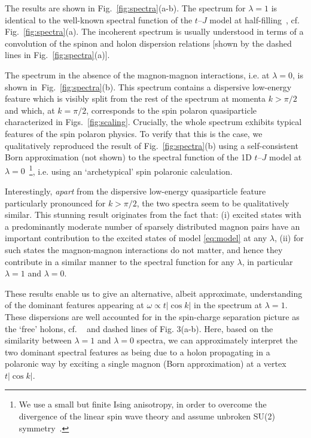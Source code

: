\documentclass[%
 reprint,
 amsmath,amssymb,
 aps,
prl,
]{revtex4-1}
\begin{document}
The results are shown in Fig.~\ref{fig:spectra}(a-b). The spectrum for $\lambda = 1$ is identical to the well-known spectral function of the $t$--$J$ model at half-filling~\cite{Kim96, Senechal2000}, cf. Fig.~\ref{fig:spectra}(a).
The incoherent spectrum is usually understood in terms of a convolution of the spinon and holon dispersion relations [shown by the dashed lines in Fig.~\ref{fig:spectra}(a)].

The spectrum in the absence of the magnon-magnon interactions, i.e. at $\lambda =0$,  is shown in~Fig.~\ref{fig:spectra}(b). 
This spectrum contains a dispersive low-energy feature which is visibly split from the rest of the spectrum at momenta $k> \pi/2$ and which, at $k=\pi/2$, corresponds to the spin polaron quasiparticle characterized in Figs.~\ref{fig:scaling}. Crucially, the whole spectrum exhibits typical features of the spin polaron physics. To verify that this is the case, we qualitatively reproduced the result of Fig.~\ref{fig:spectra}(b) using a self-consistent Born approximation (not shown) to the spectral function of the 1D $t$--$J$ model at $\lambda =0$~\footnote{We use a small but finite Ising anisotropy, in order to overcome the divergence of the linear spin wave theory and assume unbroken SU(2) symmetry~\cite{Brink1998}.}, i.e. using an `archetypical' spin polaronic calculation. 

Interestingly, {\it apart} from the dispersive low-energy
quasiparticle feature particularly pronounced for $k> \pi/2$, the two spectra seem to be qualitatively similar. 
This stunning result originates from the fact that: (i) excited states with a predominantly moderate number of sparsely distributed magnon pairs have an important contribution to the excited states of model \eqref{eq:model}
at any $\lambda$, (ii) for such states the magnon-magnon interactions do not matter, and hence they contribute in a similar manner to the spectral function for any $\lambda$, in particular $\lambda=1$ and $\lambda=0$. 

These results enable us to give an alternative, albeit approximate, understanding of the dominant features appearing at $\omega \propto t |\cos k |$ in the spectrum at $\lambda=1$. These dispersions are well accounted for in the spin-charge separation picture as the `free' holons, cf. ~\cite{Ede97, Kim97} and dashed lines of Fig. 3(a-b). Here, based on the similarity between $\lambda =1 $ and $\lambda = 0$ spectra, we can approximately interpret the two dominant spectral features as being due to a holon propagating in a polaronic way by exciting a single magnon (Born approximation) at a vertex $t |\cos k | $.
\end{document}
